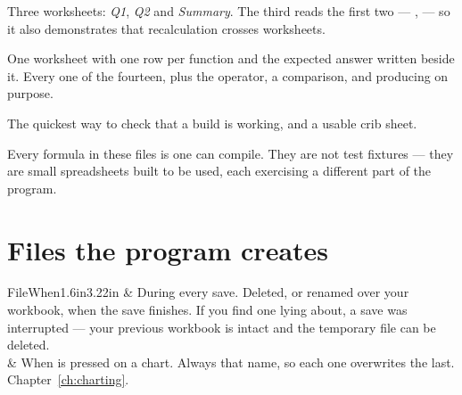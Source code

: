 
Three worksheets: \emph{Q1}, \emph{Q2} and \emph{Summary}. The third reads the
first two --- ,  --- so it also
demonstrates that recalculation crosses worksheets.


One worksheet with one row per function and the expected answer written beside
it. Every one of the fourteen, plus the \lit{\^{}} operator, a comparison, and
 producing  on purpose.

The quickest way to check that a build is working, and a usable crib sheet.

\begin{ccnote}
Every formula in these files is one \ccprod{} can compile. They are not test
fixtures --- they are small spreadsheets built to be used, each exercising a
different part of the program.
\end{ccnote}

\section{Files the program creates}

\begin{cctable}{File}{When}{1.6in}{3.22in}
 & During every save. Deleted, or renamed over your
workbook, when the save finishes. If you find one lying about, a save was
interrupted --- your previous workbook is intact and the temporary file can be
deleted. \\
 & When  is pressed on a chart. Always that name, so
each one overwrites the last. Chapter~\ref{ch:charting}. \\
\end{cctable}
